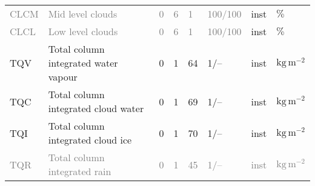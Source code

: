 \begin{longtable}{p{2.0cm}p{5.0cm}p{0.7cm}p{0.7cm}p{0.7cm}p{1.4cm}p{1cm}p{1cm}}
\textcolor{gray}{CLCM}         &  \textcolor{gray}{Mid level clouds}\footnotemark[3]                                    &               \textcolor{gray}{0}                 &                     \textcolor{gray}{6}     &                    \textcolor{gray}{1}     &                 \textcolor{gray}{100/100}       &                      inst                   &        $\mathrm{\%}$          \\
\textcolor{gray}{CLCL}         &  \textcolor{gray}{Low level clouds}\footnotemark[3]                                    &               \textcolor{gray}{0}                 &                     \textcolor{gray}{6}     &                    \textcolor{gray}{1}     &                 \textcolor{gray}{100/100}       &                      inst                   &        $\mathrm{\%}$          \\
TQV                            &  Total column integrated water vapour                                                  &               0                                   &                     1                       &                    64                      &                 1/--                            &                      inst                   &        $\mathrm{kg\,m^{-2}}$  \\
TQC                            &  Total column integrated cloud water                                                   &               0                                   &                     1                       &                    69                      &                 1/--                            &                      inst                   &        $\mathrm{kg\,m^{-2}}$  \\
TQI                            &  Total column integrated cloud ice                                                     &               0                                   &                     1                       &                    70                      &                 1/--                            &                      inst                   &        $\mathrm{kg\,m^{-2}}$  \\
\textcolor{gray}{TQR}          &  \textcolor{gray}{Total column integrated rain}\footnotemark[3]                        &               \textcolor{gray}{0}                 &                     \textcolor{gray}{1}     &                    \textcolor{gray}{45}    &                 \textcolor{gray}{1/--}          &                      \textcolor{gray}{inst} &        \textcolor{gray}{$\mathrm{kg\,m^{-2}}$}  \\

\end{longtable}
